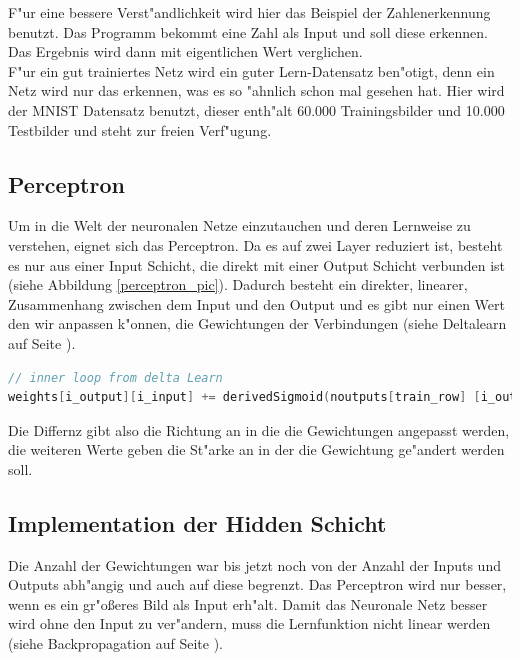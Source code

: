 \documentclass[12pt,a4paper]{scrartcl}
\begin{document}
F"ur eine bessere Verst"andlichkeit wird hier das Beispiel der Zahlenerkennung benutzt. Das Programm bekommt eine Zahl als Input und soll diese erkennen. Das Ergebnis wird dann mit eigentlichen Wert verglichen.\\
 
F"ur ein gut trainiertes Netz wird ein guter Lern-Datensatz ben"otigt, denn ein Netz wird nur das erkennen, was es so "ahnlich schon mal gesehen hat. Hier wird der MNIST Datensatz benutzt, dieser enth"alt 60.000 Trainingsbilder und 10.000 Testbilder und steht zur freien Verf"ugung.\\

\subsection{Perceptron}

Um in die Welt der neuronalen Netze einzutauchen und deren Lernweise zu verstehen, eignet sich das Perceptron. Da es auf zwei Layer reduziert ist, besteht es nur aus einer Input Schicht, die direkt mit einer Output Schicht verbunden ist (siehe Abbildung \ref{perceptron_pic}). Dadurch besteht ein direkter, linearer, Zusammenhang zwischen dem Input und den Output und es gibt nur einen Wert den wir anpassen k"onnen, die Gewichtungen der Verbindungen (siehe Deltalearn auf Seite \pageref{deltalearn_text}).\\

\begin{lstlisting}[language=C]
// inner loop from delta Learn
weights[i_output][i_input] += derivedSigmoid(noutputs[train_row] [i_output]) * train_image_data[train_row][i_input] * earn_rate * -2 * (outputs[train_row][i_output] - train_label_data[train_row][i_output]);
\end{lstlisting} 

Die Differnz gibt also die Richtung an in die die Gewichtungen angepasst werden, die weiteren Werte geben die St"arke an in der die Gewichtung ge"andert werden soll.\\

\subsection{Implementation der Hidden Schicht}

Die Anzahl der Gewichtungen war bis jetzt noch von der Anzahl der Inputs und Outputs abh"angig und auch auf diese begrenzt. Das Perceptron wird nur besser, wenn es ein gr"o\ss eres Bild als Input erh"alt. Damit das Neuronale Netz besser wird ohne den Input zu ver"andern, muss die Lernfunktion nicht linear werden (siehe Backpropagation auf Seite \pageref{backprop_text}).\\
\end{document}

